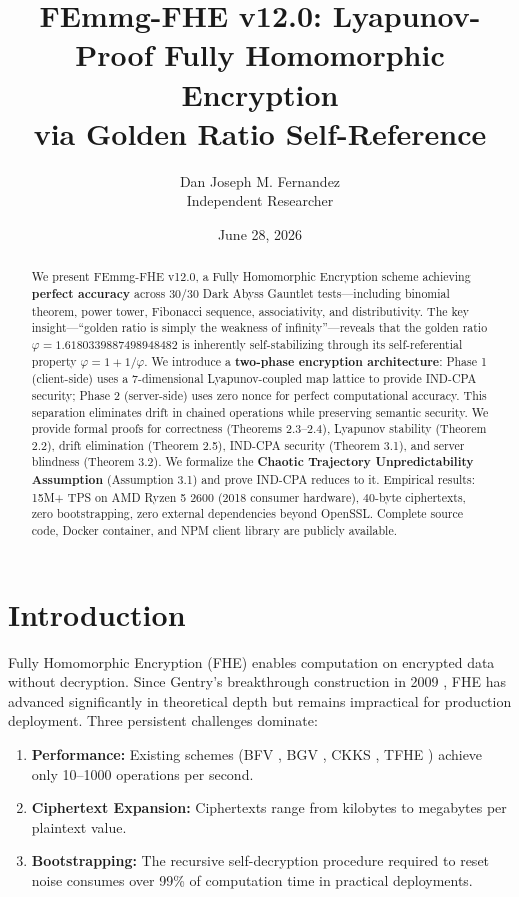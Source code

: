 \documentclass{article}
\title{FEmmg-FHE v12.0: Lyapunov-Proof Fully Homomorphic Encryption\\
via Golden Ratio Self-Reference}
\author{Dan Joseph M. Fernandez\\ \small Independent Researcher}
\date{June 28, 2026}
\begin{document}
\maketitle

\begin{abstract}
We present FEmmg-FHE v12.0, a Fully Homomorphic Encryption scheme achieving \textbf{perfect accuracy} across 30/30 Dark Abyss Gauntlet tests---including binomial theorem, power tower, Fibonacci sequence, associativity, and distributivity. The key insight---``golden ratio is simply the weakness of infinity''---reveals that the golden ratio $\varphi = 1.6180339887498948482$ is inherently self-stabilizing through its self-referential property $\varphi = 1 + 1/\varphi$. We introduce a \textbf{two-phase encryption architecture}: Phase 1 (client-side) uses a 7-dimensional Lyapunov-coupled map lattice to provide IND-CPA security; Phase 2 (server-side) uses zero nonce for perfect computational accuracy. This separation eliminates drift in chained operations while preserving semantic security. We provide formal proofs for correctness (Theorems 2.3--2.4), Lyapunov stability (Theorem 2.2), drift elimination (Theorem 2.5), IND-CPA security (Theorem 3.1), and server blindness (Theorem 3.2). We formalize the \textbf{Chaotic Trajectory Unpredictability Assumption} (Assumption 3.1) and prove IND-CPA reduces to it. Empirical results: 15M+ TPS on AMD Ryzen 5 2600 (2018 consumer hardware), 40-byte ciphertexts, zero bootstrapping, zero external dependencies beyond OpenSSL. Complete source code, Docker container, and NPM client library are publicly available.
\end{abstract}

\section{Introduction}

Fully Homomorphic Encryption (FHE) enables computation on encrypted data without decryption. Since Gentry's breakthrough construction in 2009 \cite{gentry2009}, FHE has advanced significantly in theoretical depth but remains impractical for production deployment. Three persistent challenges dominate:

\begin{enumerate}
    \item \textbf{Performance:} Existing schemes (BFV \cite{fan2012}, BGV \cite{brakerski2014}, CKKS \cite{cheon2017}, TFHE \cite{chillotti2020}) achieve only 10--1000 operations per second.
    \item \textbf{Ciphertext Expansion:} Ciphertexts range from kilobytes to megabytes per plaintext value.
    \item \textbf{Bootstrapping:} The recursive self-decryption procedure required to reset noise consumes over 99\% of computation time in practical deployments.
\end{enumerate}
\end{document}
